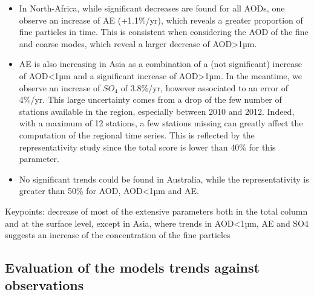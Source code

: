 \documentclass[journal abbreviation, manuscript]{copernicus}
\begin{document}
\begin{itemize}
 \item In North-Africa, while significant decreases are found for all AODs, one observe an increase of AE (+1.1\%/yr), which reveals a greater proportion of fine particles in time. This is consistent when considering the AOD of the fine and coarse modes, which reveal a larger decrease of AOD>1µm.
 \item AE is also increasing in Asia as a combination of a (not significant) increase of AOD<1µm and a significant increase of AOD>1µm. In the meantime, we observe an increase of $SO_{4}$ of 3.8\%/yr, however associated to an error of 4\%/yr. This large uncertainty comes from a drop of the few number of stations available in the region, especially between 2010 and 2012. Indeed, with a maximum of 12 stations, a few stations missing can greatly affect the computation of the regional time series. This is reflected by the representativity study since the total score is lower than 40\% for this parameter.
 \item No significant trends could be found in Australia, while the representativity is greater than 50\% for AOD, AOD<1µm and AE.

\end{itemize}

Keypoints: decrease of most of the extensive parameters both in the total column and at the surface level, except in Asia, where trends in AOD<1µm, AE and SO4 suggests an increase of the concentration of the fine particles

\subsection{Evaluation of the models trends against observations}
\end{document}
